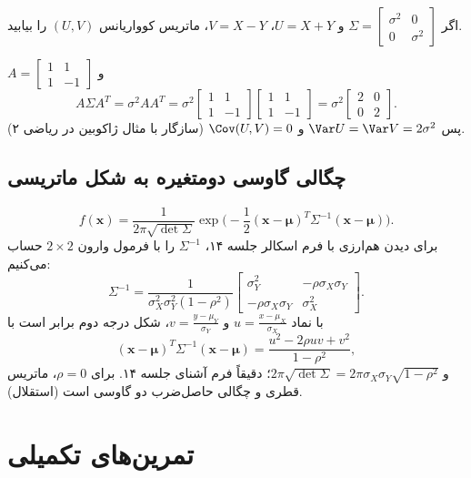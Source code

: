 \begin{example}
اگر $\Sigma=\begin{bmatrix}\sigma^2&0\\0&\sigma^2\end{bmatrix}$ و $U=X+Y$، $V=X-Y$، ماتریس کوواریانس $(U,V)$ را بیابید.
\begin{solution}
$A=\begin{bmatrix}1&1\\1&-1\end{bmatrix}$ و
\[
A\Sigma A^T=\sigma^2AA^T=\sigma^2\begin{bmatrix}1&1\\1&-1\end{bmatrix}\begin{bmatrix}1&1\\1&-1\end{bmatrix}=\sigma^2\begin{bmatrix}2&0\\0&2\end{bmatrix}.
\]
پس $\Var U=\Var V=2\sigma^2$ و $\Cov(U,V)=0$ (سازگار با مثال ژاکوبین در ریاضی ۲).
\end{solution}
\end{example}

\subsection{چگالی گاوسی دومتغیره به شکل ماتریسی}
\[
f(\mathbf x)=\frac{1}{2\pi\sqrt{\det\Sigma}}\exp\Big(-\frac12(\mathbf x-\boldsymbol\mu)^T\Sigma^{-1}(\mathbf x-\boldsymbol\mu)\Big).
\]
برای دیدن هم‌ارزی با فرم اسکالر جلسه ۱۴، $\Sigma^{-1}$ را با فرمول وارون $2\times2$ حساب می‌کنیم:
\[
\Sigma^{-1}=\frac{1}{\sigma_X^2\sigma_Y^2(1-\rho^2)}\begin{bmatrix}\sigma_Y^2&-\rho\sigma_X\sigma_Y\\-\rho\sigma_X\sigma_Y&\sigma_X^2\end{bmatrix}.
\]
با نماد $u=\frac{x-\mu_X}{\sigma_X}$ و $v=\frac{y-\mu_Y}{\sigma_Y}$، شکل درجه دوم برابر است با
\[
(\mathbf x-\boldsymbol\mu)^T\Sigma^{-1}(\mathbf x-\boldsymbol\mu)=\frac{u^2-2\rho uv+v^2}{1-\rho^2},
\]
و $2\pi\sqrt{\det\Sigma}=2\pi\sigma_X\sigma_Y\sqrt{1-\rho^2}$؛ دقیقاً فرم آشنای جلسه ۱۴. برای $\rho=0$، ماتریس قطری و چگالی حاصل‌ضرب دو گاوسی است (استقلال).

\section{تمرین‌های تکمیلی}

